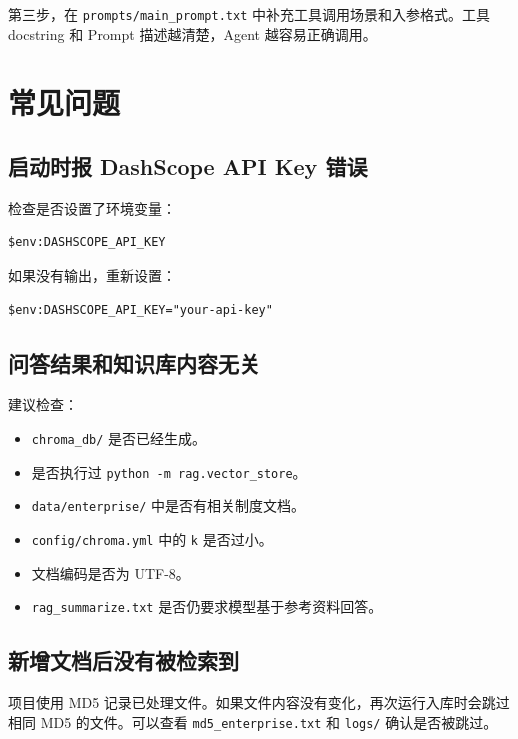 \documentclass[UTF8,zihao=-4]{ctexart}
\begin{document}
第三步，在 \texttt{prompts/main\_prompt.txt} 中补充工具调用场景和入参格式。工具 docstring 和 Prompt 描述越清楚，Agent 越容易正确调用。

\section{常见问题}

\subsection{启动时报 DashScope API Key 错误}

检查是否设置了环境变量：

\begin{Verbatim}[breaklines=true,breakanywhere=true,fontsize=\small]
$env:DASHSCOPE_API_KEY
\end{Verbatim}

如果没有输出，重新设置：

\begin{Verbatim}[breaklines=true,breakanywhere=true,fontsize=\small]
$env:DASHSCOPE_API_KEY="your-api-key"
\end{Verbatim}

\subsection{问答结果和知识库内容无关}

建议检查：

\begin{itemize}
\item \texttt{chroma\_db/} 是否已经生成。
\item 是否执行过 \texttt{python -m rag.vector\_store}。
\item \texttt{data/enterprise/} 中是否有相关制度文档。
\item \texttt{config/chroma.yml} 中的 \texttt{k} 是否过小。
\item 文档编码是否为 UTF-8。
\item \texttt{rag\_summarize.txt} 是否仍要求模型基于参考资料回答。
\end{itemize}

\subsection{新增文档后没有被检索到}

项目使用 MD5 记录已处理文件。如果文件内容没有变化，再次运行入库时会跳过相同 MD5 的文件。可以查看 \texttt{md5\_enterprise.txt} 和 \texttt{logs/} 确认是否被跳过。
\end{document}
